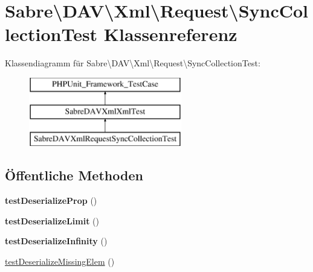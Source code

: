 \hypertarget{class_sabre_1_1_d_a_v_1_1_xml_1_1_request_1_1_sync_collection_test}{}\section{Sabre\textbackslash{}D\+AV\textbackslash{}Xml\textbackslash{}Request\textbackslash{}Sync\+Collection\+Test Klassenreferenz}
\label{class_sabre_1_1_d_a_v_1_1_xml_1_1_request_1_1_sync_collection_test}
Klassendiagramm für Sabre\textbackslash{}D\+AV\textbackslash{}Xml\textbackslash{}Request\textbackslash{}Sync\+Collection\+Test\+:\begin{figure}[H]
\begin{center}
\leavevmode
\includegraphics[height=3.000000cm]{class_sabre_1_1_d_a_v_1_1_xml_1_1_request_1_1_sync_collection_test}
\end{center}
\end{figure}
\subsection*{Öffentliche Methoden}
\begin{DoxyCompactItemize}
\item 
\mbox{\label{class_sabre_1_1_d_a_v_1_1_xml_1_1_request_1_1_sync_collection_test_a2584212fb3bea3b5b7ee83114477e7ce}} 
{\bfseries test\+Deserialize\+Prop} ()
\item 
\mbox{\label{class_sabre_1_1_d_a_v_1_1_xml_1_1_request_1_1_sync_collection_test_a2aa048dbd2f5e361722ee2a48dccaa6a}} 
{\bfseries test\+Deserialize\+Limit} ()
\item 
\mbox{\label{class_sabre_1_1_d_a_v_1_1_xml_1_1_request_1_1_sync_collection_test_a24cf7e5acb82eb45e6f4cd0afc58dce0}} 
{\bfseries test\+Deserialize\+Infinity} ()
\item 
\mbox{\hyperlink{class_sabre_1_1_d_a_v_1_1_xml_1_1_request_1_1_sync_collection_test_ab4b42ecc29a80bb59e282cf0ad5a9ab4}{test\+Deserialize\+Missing\+Elem}} ()
\end{DoxyCompactItemize}
